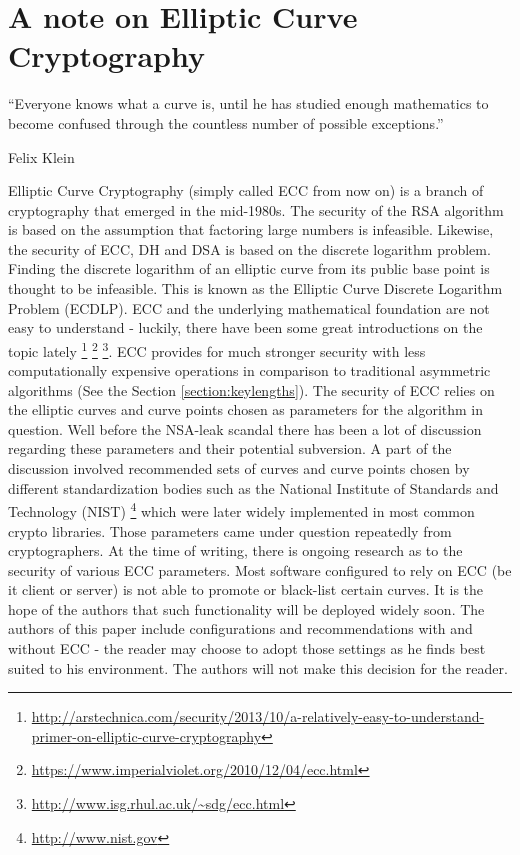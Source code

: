 \section{A note on Elliptic Curve Cryptography}
\label{section:EllipticCurveCryptography}


\epigraph{``Everyone knows what a curve is, until he has studied enough
mathematics to become confused through the countless number of possible
exceptions.''}{Felix Klein }

Elliptic Curve Cryptography (simply called ECC from now on) is a branch of
cryptography that emerged in the mid-1980s.  The security of the RSA
algorithm is based on the assumption that factoring large numbers is infeasible.
Likewise, the security of ECC, DH and DSA is based on the discrete logarithm
problem\cite{Wikipedia:Discrete,McC90,WR13}.  Finding the discrete logarithm of
an elliptic curve from its public base point is thought to be infeasible. This
is known as the Elliptic Curve Discrete Logarithm Problem (ECDLP). ECC and the
underlying mathematical foundation are not easy to understand - luckily, there
have been some great introductions on the topic lately
\footnote{\url{http://arstechnica.com/security/2013/10/a-relatively-easy-to-understand-primer-on-elliptic-curve-cryptography}}
\footnote{\url{https://www.imperialviolet.org/2010/12/04/ecc.html}}
\footnote{\url{http://www.isg.rhul.ac.uk/~sdg/ecc.html}}.
ECC provides for much stronger security with less computationally expensive
operations in comparison to traditional asymmetric algorithms (See the Section
\ref{section:keylengths}).
The security of ECC relies on the elliptic curves and curve points chosen as
parameters for the algorithm in question. Well before the NSA-leak scandal
there has been a lot of discussion regarding these parameters and their
potential subversion. A part of the discussion involved recommended sets of
curves and curve points chosen by different standardization bodies such as the
National Institute of Standards and Technology (NIST)
\footnote{\url{http://www.nist.gov}} which were later widely implemented in
most common crypto libraries. Those parameters came under question repeatedly
from cryptographers\cite{BL13,Sch13b,W13}.  At the time of writing, there is
ongoing research as to the security of various ECC parameters\cite{DJBSC}.
Most software configured to rely on ECC (be it client or server) is not able to
promote or black-list certain curves. It is the hope of the authors that such
functionality will be deployed widely soon.  The authors of this paper include
configurations and recommendations with and without ECC - the reader may choose
to adopt those settings as he finds best suited to his environment. The authors
will not make this decision for the reader.


